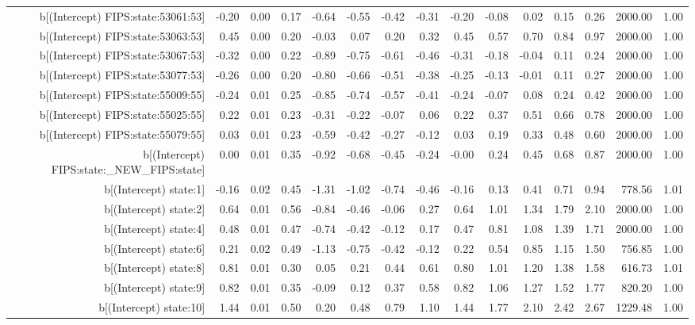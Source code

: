 \begin{table}[ht]
\begin{tabular}{rrrrrrrrrrrrrrr}
  b[(Intercept) FIPS:state:53061:53] & -0.20 & 0.00 & 0.17 & -0.64 & -0.55 & -0.42 & -0.31 & -0.20 & -0.08 & 0.02 & 0.15 & 0.26 & 2000.00 & 1.00 \\ 
  b[(Intercept) FIPS:state:53063:53] & 0.45 & 0.00 & 0.20 & -0.03 & 0.07 & 0.20 & 0.32 & 0.45 & 0.57 & 0.70 & 0.84 & 0.97 & 2000.00 & 1.00 \\ 
  b[(Intercept) FIPS:state:53067:53] & -0.32 & 0.00 & 0.22 & -0.89 & -0.75 & -0.61 & -0.46 & -0.31 & -0.18 & -0.04 & 0.11 & 0.24 & 2000.00 & 1.00 \\ 
  b[(Intercept) FIPS:state:53077:53] & -0.26 & 0.00 & 0.20 & -0.80 & -0.66 & -0.51 & -0.38 & -0.25 & -0.13 & -0.01 & 0.11 & 0.27 & 2000.00 & 1.00 \\ 
  b[(Intercept) FIPS:state:55009:55] & -0.24 & 0.01 & 0.25 & -0.85 & -0.74 & -0.57 & -0.41 & -0.24 & -0.07 & 0.08 & 0.24 & 0.42 & 2000.00 & 1.00 \\ 
  b[(Intercept) FIPS:state:55025:55] & 0.22 & 0.01 & 0.23 & -0.31 & -0.22 & -0.07 & 0.06 & 0.22 & 0.37 & 0.51 & 0.66 & 0.78 & 2000.00 & 1.00 \\ 
  b[(Intercept) FIPS:state:55079:55] & 0.03 & 0.01 & 0.23 & -0.59 & -0.42 & -0.27 & -0.12 & 0.03 & 0.19 & 0.33 & 0.48 & 0.60 & 2000.00 & 1.00 \\ 
  b[(Intercept) FIPS:state:\_NEW\_FIPS:state] & 0.00 & 0.01 & 0.35 & -0.92 & -0.68 & -0.45 & -0.24 & -0.00 & 0.24 & 0.45 & 0.68 & 0.87 & 2000.00 & 1.00 \\ 
  b[(Intercept) state:1] & -0.16 & 0.02 & 0.45 & -1.31 & -1.02 & -0.74 & -0.46 & -0.16 & 0.13 & 0.41 & 0.71 & 0.94 & 778.56 & 1.01 \\ 
  b[(Intercept) state:2] & 0.64 & 0.01 & 0.56 & -0.84 & -0.46 & -0.06 & 0.27 & 0.64 & 1.01 & 1.34 & 1.79 & 2.10 & 2000.00 & 1.00 \\ 
  b[(Intercept) state:4] & 0.48 & 0.01 & 0.47 & -0.74 & -0.42 & -0.12 & 0.17 & 0.47 & 0.81 & 1.08 & 1.39 & 1.71 & 2000.00 & 1.00 \\ 
  b[(Intercept) state:6] & 0.21 & 0.02 & 0.49 & -1.13 & -0.75 & -0.42 & -0.12 & 0.22 & 0.54 & 0.85 & 1.15 & 1.50 & 756.85 & 1.00 \\ 
  b[(Intercept) state:8] & 0.81 & 0.01 & 0.30 & 0.05 & 0.21 & 0.44 & 0.61 & 0.80 & 1.01 & 1.20 & 1.38 & 1.58 & 616.73 & 1.01 \\ 
  b[(Intercept) state:9] & 0.82 & 0.01 & 0.35 & -0.09 & 0.12 & 0.37 & 0.58 & 0.82 & 1.06 & 1.27 & 1.52 & 1.77 & 820.20 & 1.00 \\ 
  b[(Intercept) state:10] & 1.44 & 0.01 & 0.50 & 0.20 & 0.48 & 0.79 & 1.10 & 1.44 & 1.77 & 2.10 & 2.42 & 2.67 & 1229.48 & 1.00 \\ 

\end{tabular}
\end{table}
